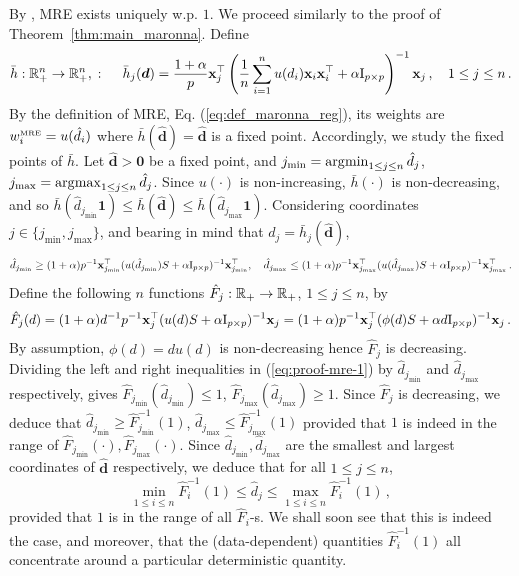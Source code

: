 \documentclass[times,sort&compress,3p]{elsarticle}
\begin{document}
By \cite[Theorem 1]{ollila2014regularized}, MRE exists uniquely w.p. $1$.
We proceed similarly to the proof of Theorem~\ref{thm:main_maronna}.
Define 
\begin{equation}
    \bar{h}:\mathbb{R}^n_+ \to \mathbb{R}^n_+,\;:\;\quad \bar{h}_j(\bm{d}) = \frac{1+\alpha}{p} {\bf x}_j^\top \left(  \frac1n \sum_{i=1}^n u(d_i){\bf x}_i{\bf x}_i^\top + \alpha \mathrm{I}_{p \times p} \right)^{-1}{\bf x}_j\,,\quad 1\le j \le n \,. 
\end{equation}
By the definition of MRE, Eq. (\ref{eq:def_maronna_reg}), its weights are $w^{\mbox{\tiny{MRE}}}_i=u(\hat{d}_i)$ where $\bar{h}(\bm{\hat{d}})=\bm{\hat{d}}$ is a fixed point. 
Accordingly,
we study the fixed points of $\bar{h}$. 
Let $\bm{\hat{d}}>\bm{0}$ be a fixed point, and $j_{\min}=\operatorname*{\arg\!\min}_{1\le j \le n}\hat{d}_j$, $j_{\max}=\operatorname*{\arg\!\max}_{1\le j \le n}\hat{d}_j$. Since $u(\cdot)$ is non-increasing, $\bar{h}(\cdot)$ is non-decreasing, and so $\bar{h}(\hat{d}_{j_{\min}}\bm{1}) \le \bar{h}(\bm{\hat{d}}) \le \bar{h}(\hat{d}_{j_{\max}}\bm{1})$. 
Considering coordinates $j\in \{j_{\min},j_{\max}\}$, and bearing in mind that 
$d_j=\bar{h}_j(\hat{\bm{d}})$,
\begin{equation}\label{eq:proof-mre-1}
    \hat{d}_{j_{\min}} \ge (1+\alpha)p^{-1}{\bf x}_{j_{\min}}^\top (u(\hat{d}_{j_{\min}})S + \alpha\mathrm{I}_{p \times p})^{-1} {\bf x}_{j_{\min}}^\top,\quad    \hat{d}_{j_{\max}} \le (1+\alpha)p^{-1}{\bf x}_{j_{\max}}^\top (u(\hat{d}_{j_{\max}})S + \alpha\mathrm{I}_{p \times p})^{-1} {\bf x}_{j_{\max}}^\top \,.
\end{equation}
Define the following $n$ functions $\hat{F}_j : \mathbb{R}_+ \to \mathbb{R}_+$, $1\le j \le n$, by
\begin{equation}\label{eq:proof-mre-2}
    \hat{F}_j({d}) = (1+\alpha)d^{-1} p^{-1} {\bf x}_j^\top (u(d)S+\alpha\mathrm{I}_{p \times p})^{-1}{\bf x}_j = (1+\alpha)p^{-1}{\bf x}_j^\top (\phi(d)S+\alpha d \mathrm{I}_{p \times p})^{-1}{\bf x}_j\,.
\end{equation}
By assumption, $\phi(d)=d u(d)$ is non-decreasing hence $\hat{F}_j$ is decreasing. 
Dividing the left and right inequalities in (\ref{eq:proof-mre-1}) by $\hat{d}_{j_{\min}}$ and $\hat{d}_{j_{\max}}$ respectively, gives $\hat{F}_{j_{\min}}(\hat{d}_{j_{\min}})\le 1$, $\hat{F}_{j_{\max}}(\hat{d}_{j_{\max}})\ge 1$. Since $\hat{F}_j$ is decreasing, we deduce that $\hat{d}_{j_{\min}} \ge \hat{F}_{j_{\min}}^{-1}(1)$, $\hat{d}_{j_{\max}} \le \hat{F}_{j_{\max}}^{-1}(1)$ provided that $1$ is indeed in the range of $\hat{F}_{j_{\min}}(\cdot),\hat{F}_{j_{\max}}(\cdot)$. Since $\hat{d}_{j_{\min}},\hat{d}_{j_{\max}}$ are the smallest and largest coordinates of $\bm{\hat{d}}$ respectively, we deduce that for all $1\le j \le n$,
\begin{equation}\label{eq:proof-mre-3}
    \min_{1\le i\le n}\hat{F}_i^{-1}(1) \le \hat{d}_j \le \max_{1\le i\le n}\hat{F}_i^{-1}(1)\,,
\end{equation}
provided that $1$ is in the range of all $\hat{F}_i$-s. We shall soon see that this is indeed the case, and moreover, that the (data-dependent) quantities $\hat{F}_i^{-1}(1)$ all concentrate around a particular deterministic quantity. 
\end{document}
